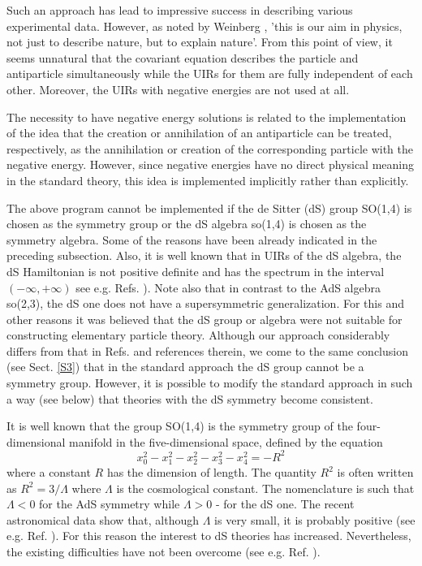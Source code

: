 \documentclass[a4paper,12pt]{article}%
\begin{document}
Such an approach has lead to impressive success in 
describing various experimental data. However, as noted by
Weinberg \cite{Wein1}, 'this is our aim in physics, not
just to describe nature, but to explain nature'. From this 
point of view, it seems unnatural that the covariant
equation describes the particle and antiparticle
simultaneously while the UIRs for them are fully 
independent of each other. Moreover, the UIRs with
negative energies are not used at all. 

The necessity to have negative energy solutions is
related to the implementation of the idea that the
creation or annihilation of an antiparticle can be treated,
respectively, as the annihilation or creation of the 
corresponding particle with the negative energy. However,
since negative energies have no direct physical meaning in
the standard theory, this idea is implemented implicitly
rather than explicitly. 

The above program cannot be implemented if
the de Sitter (dS) group SO(1,4) is chosen as the 
symmetry group or the dS algebra so(1,4) is chosen as
the symmetry algebra. Some of the reasons have been already
indicated in the preceding subsection. Also, it is 
well known that in UIRs of the dS 
algebra, the dS Hamiltonian is not positive definite and
has the spectrum in the interval $(-\infty,+\infty)$ 
see e.g. Refs. \cite{Dobrev,Men,Moy,lev1,lev1a}). 
Note also that in contrast to the AdS
algebra so(2,3), the dS one does not have a supersymmetric
generalization. For this and other reasons it was believed 
that the dS group or algebra were not suitable for constructing 
elementary particle theory. Although our approach
considerably differs from that in Refs. \cite{Narlikar,Susskind}
and references therein, we come to the same conclusion
(see Sect. \ref{S3}) that in the standard approach the dS 
group cannot be a symmetry group. However, it is possible to 
modify the standard approach in such a way (see below) that 
theories with the dS symmetry become consistent.

It is well known that the group SO(1,4) is the symmetry 
group of the four-dimensional manifold in the five-dimensional 
space, defined by the equation 
\begin{equation}
 x_0^2-x_1^2-x_2^2-x_3^2-x_4^2=-R^2
\label{1}
\end{equation}
where a constant $R$ has the dimension of length.
The quantity $R^2$ is often written as $R^2=3/\Lambda$ where
$\Lambda$ is the cosmological constant. 
The nomenclature is such that $\Lambda < 0$ for  
the AdS symmetry while $\Lambda >0$ - for the dS one.
The recent astronomical data show that, although
$\Lambda$ is very small, it is probably positive 
(see e.g. Ref. \cite{Perlmutter}). For this reason the 
interest to dS theories has increased. Nevertheless, the existing
difficulties have not been overcome (see e.g. Ref. \cite{Witten}).
\end{document}
